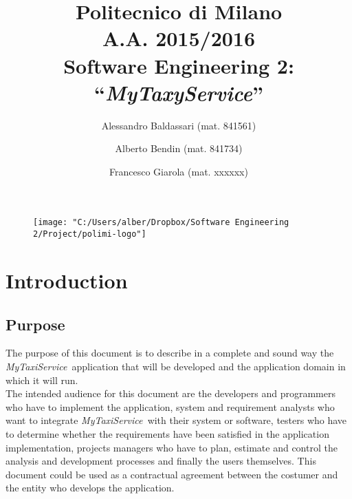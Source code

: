 \documentclass[a4paper,11pt]{report} %
\title{Politecnico di Milano\\A.A. 2015/2016\\Software Engineering 2: ``{\em MyTaxyService}''}
\author{Alessandro Baldassari (mat. 841561) \and Alberto Bendin (mat. 841734) \and Francesco Giarola (mat. xxxxxx)}
\newcommand{\mts}{\mbox{\normalfont\itshape MyTaxiService\ }}
\begin{document}
	
	
	\begin{figure}[t]
		\centering
		\texttt{[image: "C:/Users/alber/Dropbox/Software Engineering 2/Project/polimi-logo"]}
		\label{fig:polimi-logo}
	\end{figure}
	
	\maketitle
		
	

	\thispagestyle{empty}
	\clearpage\mbox{}\clearpage
	
	
	
	\renewcommand*\thesection{\arabic{section}}
	\renewcommand*\thesubsection{\arabic{section}.\arabic{subsection}}
	\renewcommand*\thesubsubsection{%
		\arabic{section}.\arabic{subsection}.\arabic{subsubsection}%
	}
	\setcounter{secnumdepth}{4}
	\setcounter{tocdepth}{4}
		
	
	\tableofcontents
	\newpage
	
	
	
	\section{Introduction}
	
	\subsection{Purpose} The purpose of this document is to describe in a complete and sound way
	the \mts application that will be developed and the application domain in which it will run.\\
	The intended audience for this document are the developers and programmers
	who have to implement the application, system and requirement
	analysts who want to integrate \mts with their system or software,
	testers who have to determine whether the requirements have been satisfied in
	the application implementation, projects managers who have to plan, estimate
	and control the analysis and development processes and finally the users themselves.
	This document could be used as a contractual agreement between the costumer
	and the entity who develops the application.
	
\end{document}
